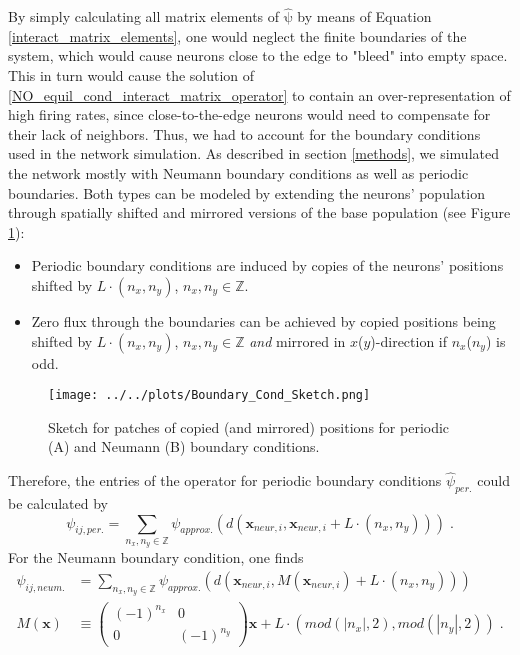 \documentclass[10pt,a4paper]{article}
\begin{document}
By simply calculating all matrix elements of $\mathrm{\hat{\psi}}$ by means of Equation \eqref{interact_matrix_elements}, one would neglect the finite boundaries of the system, which would cause neurons close to the edge to "bleed" into empty space. This in turn would cause the solution of \eqref{NO_equil_cond_interact_matrix_operator} to contain an over-representation of high firing rates, since close-to-the-edge neurons would need to compensate for their lack of neighbors. Thus, we had to account for the boundary conditions used in the network simulation. As described in section \ref{methods}, we simulated the network mostly with Neumann boundary conditions as well as periodic boundaries. Both types can be modeled by extending the neurons' population through spatially shifted and mirrored versions of the base population (see Figure \ref{Bound_Cond_Patches}):
\begin{itemize}
\item Periodic boundary conditions are induced by copies of the neurons' positions shifted by $L\cdot (n_x,n_y)$, $n_x,n_y \in \mathbb{Z}$.
\item Zero flux through the boundaries can be achieved by copied positions being shifted by $L\cdot (n_x,n_y)$, $n_x,n_y \in \mathbb{Z}$ \textit{and} mirrored in $x$($y$)-direction if $n_x$($n_y$) is odd.
\end{itemize}
\begin{figure}
\begin{center}
\texttt{[image: ../../plots/Boundary\_Cond\_Sketch.png]}
\end{center}
\caption{Sketch for patches of copied (and mirrored) positions for periodic (A) and Neumann (B) boundary conditions.}
\label{Bound_Cond_Patches}
\end{figure}
Therefore, the entries of the operator for periodic boundary conditions $\hat{\psi}_{per.}$ could be calculated by
\begin{equation}
\psi_{ij,per.} = \sum_{n_x,n_y \in \mathbb{Z}} \psi_{approx.} (d(\mathbf{x}_{neur,i},\mathbf{x}_{neur,i} + L \cdot (n_x,n_y))) \; .
\label{Psi_entries_periodic_bound}
\end{equation}
For the Neumann boundary condition, one finds
\begin{align}
\psi_{ij,neum.} &= \sum_{n_x,n_y \in \mathbb{Z}} \psi_{approx.} \left( d(\mathbf{x}_{neur,i},M(\mathbf{x}_{neur,i}) + L \cdot (n_x,n_y)) \right) \label{Psi_entries_neumann_bound} \\
M(\mathbf{x}) &\equiv  
 \begin{pmatrix}
  (-1)^{n_x} & 0\\
  0 & (-1)^{n_y}
 \end{pmatrix}
\mathbf{x} + L \cdot (mod(\left| n_x\right|,2),mod(\left| n_y\right|,2)) \; . \label{Mirror_Operator}
\end{align}
\end{document}
